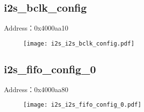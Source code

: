 \subsection{i2s\_bclk\_config}
\label{i2s-i2s-bclk-config}
Address：0x4000aa10
 \begin{figure}[H]
\texttt{[image: i2s\_i2s\_bclk\_config.pdf]}
\end{figure}

\subsection{i2s\_fifo\_config\_0}
\label{i2s-i2s-fifo-config-0}
Address：0x4000aa80
 \begin{figure}[H]
\texttt{[image: i2s\_i2s\_fifo\_config\_0.pdf]}
\end{figure}

